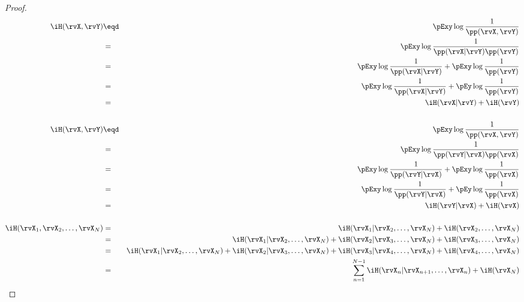 \begin{theorem}
\label{thm:chain}
\end{theorem}
\begin{proof}
\begin{eqnarray*}
  \iH(\rvX,\rvY)
    &\eqd& \pExy \log \frac{1}{\pp(\rvX,\rvY)}
  \\&=&    \pExy \log \frac{1}{\pp(\rvX|\rvY)\pp(\rvY)}
  \\&=&    \pExy \log \frac{1}{\pp(\rvX|\rvY)} + \pExy \log \frac{1}{\pp(\rvY)}
  \\&=&    \pExy \log \frac{1}{\pp(\rvX|\rvY)} + \pEy \log \frac{1}{\pp(\rvY)}
  \\&=&    \iH(\rvX|\rvY) + \iH(\rvY)
\\
\\
  \iH(\rvX,\rvY)
    &\eqd& \pExy \log \frac{1}{\pp(\rvX,\rvY)}
  \\&=&    \pExy \log \frac{1}{\pp(\rvY|\rvX)\pp(\rvX)}
  \\&=&    \pExy \log \frac{1}{\pp(\rvY|\rvX)} + \pExy \log \frac{1}{\pp(\rvX)}
  \\&=&    \pExy \log \frac{1}{\pp(\rvY|\rvX)} + \pEy \log \frac{1}{\pp(\rvX)}
  \\&=&    \iH(\rvY|\rvX) + \iH(\rvX)
\\
\\
  \iH(\rvX_1,\rvX_2,\ldots,\rvX_N) 
    &=& \iH(\rvX_1|\rvX_2,\ldots,\rvX_N) + \iH(\rvX_2,\ldots,\rvX_N)
  \\&=& \iH(\rvX_1|\rvX_2,\ldots,\rvX_N) + \iH(\rvX_2|\rvX_3,\ldots,\rvX_N) + \iH(\rvX_3,\ldots,\rvX_N)
  \\&=& \iH(\rvX_1|\rvX_2,\ldots,\rvX_N) + \iH(\rvX_2|\rvX_3,\ldots,\rvX_N) + \iH(\rvX_3|\rvX_4,\ldots,\rvX_N) + \iH(\rvX_4,\ldots,\rvX_N)
  \\&=& \sum_{n=1}^{N-1}\iH(\rvX_n|\rvX_{n+1},\ldots,\rvX_n) + \iH(\rvX_N)
\end{eqnarray*}
\end{proof}


